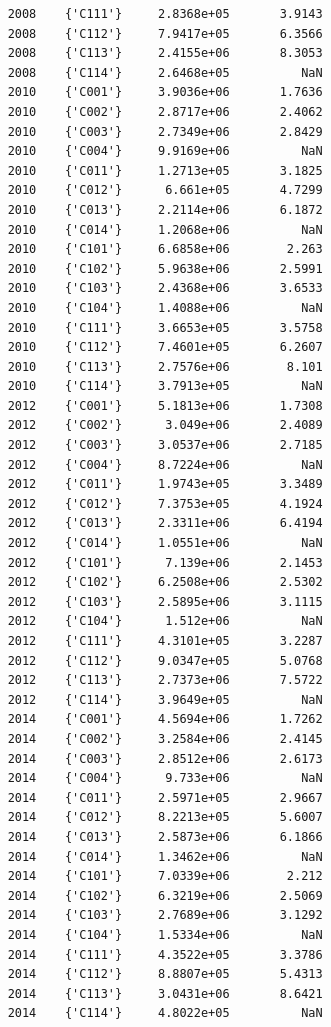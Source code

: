 \documentclass[
]{book}
\begin{document}
\begin{verbatim}
    2008    {'C111'}     2.8368e+05       3.9143 
    2008    {'C112'}     7.9417e+05       6.3566 
    2008    {'C113'}     2.4155e+06       8.3053 
    2008    {'C114'}     2.6468e+05          NaN 
    2010    {'C001'}     3.9036e+06       1.7636 
    2010    {'C002'}     2.8717e+06       2.4062 
    2010    {'C003'}     2.7349e+06       2.8429 
    2010    {'C004'}     9.9169e+06          NaN 
    2010    {'C011'}     1.2713e+05       3.1825 
    2010    {'C012'}      6.661e+05       4.7299 
    2010    {'C013'}     2.2114e+06       6.1872 
    2010    {'C014'}     1.2068e+06          NaN 
    2010    {'C101'}     6.6858e+06        2.263 
    2010    {'C102'}     5.9638e+06       2.5991 
    2010    {'C103'}     2.4368e+06       3.6533 
    2010    {'C104'}     1.4088e+06          NaN 
    2010    {'C111'}     3.6653e+05       3.5758 
    2010    {'C112'}     7.4601e+05       6.2607 
    2010    {'C113'}     2.7576e+06        8.101 
    2010    {'C114'}     3.7913e+05          NaN 
    2012    {'C001'}     5.1813e+06       1.7308 
    2012    {'C002'}      3.049e+06       2.4089 
    2012    {'C003'}     3.0537e+06       2.7185 
    2012    {'C004'}     8.7224e+06          NaN 
    2012    {'C011'}     1.9743e+05       3.3489 
    2012    {'C012'}     7.3753e+05       4.1924 
    2012    {'C013'}     2.3311e+06       6.4194 
    2012    {'C014'}     1.0551e+06          NaN 
    2012    {'C101'}      7.139e+06       2.1453 
    2012    {'C102'}     6.2508e+06       2.5302 
    2012    {'C103'}     2.5895e+06       3.1115 
    2012    {'C104'}      1.512e+06          NaN 
    2012    {'C111'}     4.3101e+05       3.2287 
    2012    {'C112'}     9.0347e+05       5.0768 
    2012    {'C113'}     2.7373e+06       7.5722 
    2012    {'C114'}     3.9649e+05          NaN 
    2014    {'C001'}     4.5694e+06       1.7262 
    2014    {'C002'}     3.2584e+06       2.4145 
    2014    {'C003'}     2.8512e+06       2.6173 
    2014    {'C004'}      9.733e+06          NaN 
    2014    {'C011'}     2.5971e+05       2.9667 
    2014    {'C012'}     8.2213e+05       5.6007 
    2014    {'C013'}     2.5873e+06       6.1866 
    2014    {'C014'}     1.3462e+06          NaN 
    2014    {'C101'}     7.0339e+06        2.212 
    2014    {'C102'}     6.3219e+06       2.5069 
    2014    {'C103'}     2.7689e+06       3.1292 
    2014    {'C104'}     1.5334e+06          NaN 
    2014    {'C111'}     4.3522e+05       3.3786 
    2014    {'C112'}     8.8807e+05       5.4313 
    2014    {'C113'}     3.0431e+06       8.6421 
    2014    {'C114'}     4.8022e+05          NaN 
\end{verbatim}
\end{document}
